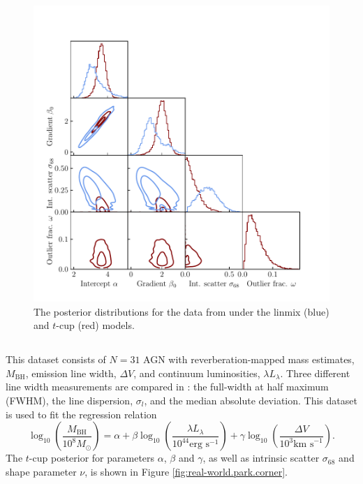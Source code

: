 \documentclass[fleqn,usenatbib]{rasti}
\begin{document}
\begin{figure}
    \includegraphics[width=\columnwidth]{graphics/real/corner_kelly.pdf}
    \caption{The posterior distributions for the data from \citet{Kelly:2007}
    under the linmix (blue) and $t$-cup (red) models.}
    \label{fig:real-world.kelly.corner}
\end{figure}

\subsection[Park et al. (2017)]{\citet{Park:2017}}

This dataset consists of $N = 31$ AGN with reverberation-mapped mass estimates,
$M_{\text{BH}}$,  emission line width, $\Delta V$, and continuum
luminosities, $\lambda L_{\lambda}$. Three different  line width
measurements are compared in \citet{Park:2017}: the full-width at half maximum
(FWHM), the line dispersion, $\sigma_l$, and the median absolute deviation. This
dataset is used to fit the regression relation
\begin{equation}
    \log_{10}\!\left( \frac{M_{\text{BH}}}{10^8 M_\odot} \right)\! =
        \alpha +
        \beta \log_{10}\! \left( \frac{\lambda L_{\lambda}}{10^{44} \text{erg s}^{-1}} \right) +
        \gamma \log_{10}\!\left( \frac{\Delta V}{10^3 \text{km s}^{-1}} \right).
        \label{eqn:real-world.park}
\end{equation}
The $t$-cup posterior for parameters $\alpha$, $\beta$ and $\gamma$, as well as
intrinsic scatter $\sigma_{68}$ and shape parameter $\nu$, is shown in Figure
\ref{fig:real-world.park.corner}.
\end{document}
